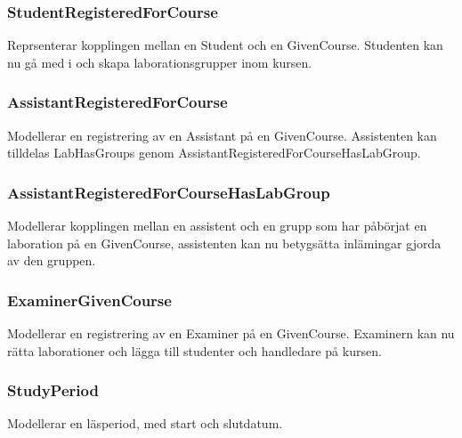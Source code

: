\subsubsection{StudentRegisteredForCourse}
Reprsenterar kopplingen mellan en Student och en GivenCourse. Studenten kan nu gå med i och skapa  laborationsgrupper inom kursen.

\subsubsection{AssistantRegisteredForCourse}
Modellerar en registrering av en Assistant på en GivenCourse. Assistenten kan tilldelas LabHasGroups genom AssistantRegisteredForCourseHasLabGroup.

\subsubsection{AssistantRegisteredForCourseHasLabGroup}
Modellerar kopplingen mellan en assistent och en grupp som har påbörjat en laboration på en GivenCourse, assistenten kan nu betygsätta inlämingar gjorda av den gruppen. 

\subsubsection{ExaminerGivenCourse}
Modellerar en registrering av en Examiner på en GivenCourse. Examinern kan nu rätta laborationer och lägga till studenter och handledare på kursen.

\subsubsection{StudyPeriod}
Modellerar en läsperiod, med start och slutdatum.
